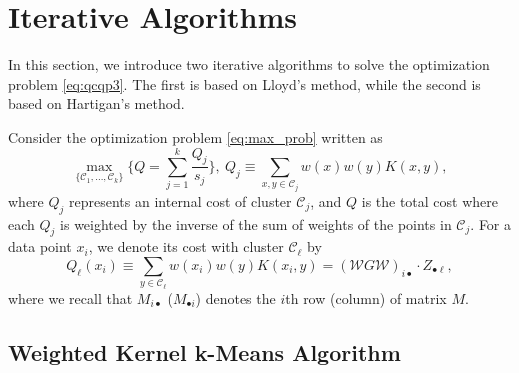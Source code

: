 \documentclass[10pt,journal,compsoc]{IEEEtran}
\newcommand\kk{K}
\newcommand\C{{\mathcal{C}}}
\begin{document}
\section{Iterative Algorithms}
\label{sec:algo}


In this section, we introduce two iterative algorithms to solve
the optimization problem \eqref{eq:qcqp3}. The first is based on Lloyd's
method, while the second is based on Hartigan's method.

Consider the optimization problem 
\eqref{eq:max_prob} 
written as
\begin{equation}
\label{eq:maxQ}
\! \max_{\{ \C_1,\dotsc,\C_k \}}  \!
\bigg\{ Q =  \sum_{j=1}^k \dfrac{Q_j}{s_j}  \bigg\},
\ Q_j \equiv \!\!\!\sum_{x,y\in\C_j} \!\!\! w(x) w(y)\kk(x,y),
\end{equation}
where $Q_j$ represents an internal cost of cluster $\C_j$, and
$Q$ is the total cost where each $Q_j$ 
is weighted by the inverse
of the sum of weights of the points in $\C_j$. 
For a data point $x_i$, we denote
its cost
with cluster $\C_\ell$ by
\begin{equation}
\label{eq:costxij}
Q_\ell(x_i) \equiv \sum_{y\in\C_\ell} w(x_i) w(y) \kk(x_i, y) = 
(\mathcal{W} G \mathcal{W})_{i \bullet} \cdot Z_{\bullet \ell},
\end{equation}
where we recall that $M_{i\bullet}$ ($M_{\bullet i}$) denotes
the $i$th row (column) of matrix $M$.


\subsection{Weighted Kernel k-Means Algorithm}
\end{document}
